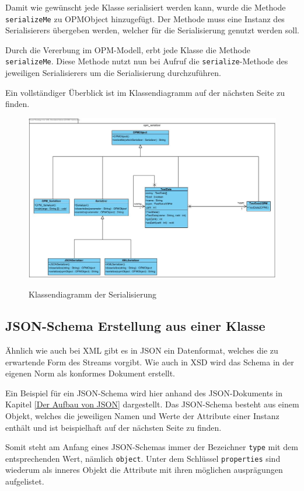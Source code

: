 Damit wie gew\"unscht jede Klasse serialisiert werden kann, wurde die Methode \texttt{serializeMe} zu OPMObject hinzugef\"ugt. Der Methode muss eine Instanz des Serialisierers \"ubergeben werden, welcher f\"ur die Serialisierung genutzt werden soll.

Durch die Vererbung im OPM-Modell, erbt jede Klasse die Methode \texttt{serializeMe}.
Diese Methode nutzt nun bei Aufruf die \texttt{serialize}-Methode des jeweiligen Serialisierers um die Serialisierung durchzuf\"uhren.

Ein vollst\"andiger \"Uberblick ist im Klassendiagramm auf der n\"achsten Seite zu finden.


\begin{figure}[ht]
\includegraphics[width=16cm]{Bilder/Erstes_EKD}
\label{Klassendiagramm der Serialisierung}
\caption{Klassendiagramm der Serialisierung} 
\end{figure}
\FloatBarrier
\subsection{JSON-Schema Erstellung aus einer Klasse}\label{JSON-Schema}
\"Ahnlich wie auch bei XML gibt es in JSON ein Datenformat, welches die zu erwartende Form des Streams vorgibt.
Wie auch in XSD wird das Schema in der eigenen Norm als konformes Dokument erstellt. \cite{JSON_Schema}

Ein Beispiel f\"ur ein JSON-Schema wird hier anhand des JSON-Dokuments in Kapitel \ref{Der Aufbau von JSON} dargestellt.
Das JSON-Schema besteht aus einem Objekt, welches die jeweiligen Namen und Werte der Attribute einer Instanz enth\"alt und ist beispielhaft auf der n\"achsten Seite zu finden.

Somit steht am Anfang eines JSON-Schemas immer der Bezeichner \texttt{type} mit dem entsprechenden Wert, n\"amlich \texttt{object}.
Unter dem Schl\"ussel \texttt{properties} sind wiederum als inneres Objekt die Attribute mit ihren m\"oglichen auspr\"agungen aufgelistet. 

